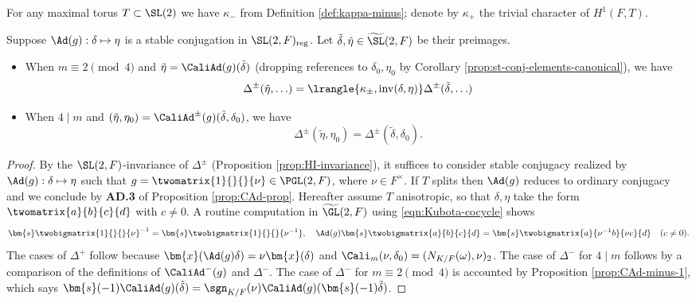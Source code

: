 \documentclass[a4paper,10pt]{article}
\begin{document}
For any maximal torus $T \subset \SL(2)$ we have $\kappa_-$ from Definition \ref{def:kappa-minus}; denote by $\kappa_+$ the trivial character of $H^1(F,T)$.
\begin{theorem}\label{prop:HI-cocycle}
	Suppose $\Ad(g): \delta \mapsto \eta$ is a stable conjugation in $\SL(2,F)_{\mathrm{reg}}$. Let $\tilde{\delta}, \tilde{\eta} \in \widetilde{\SL}(2,F)$ be their preimages.
	\begin{itemize}
		\item When $m \equiv 2 \pmod 4$ and $\tilde{\eta} = \CaliAd(g)(\tilde{\delta})$ (dropping references to $\delta_0, \eta_0$ by Corollary \ref{prop:st-conj-elements-canonical}), we have
			\begin{equation*}
				\Delta^\pm(\tilde{\eta}, \ldots) = \lrangle{\kappa_\pm, \mathrm{inv}(\delta, \eta)} \Delta^\pm(\tilde{\delta}, \ldots)
			\end{equation*}
		\item When $4 \mid m$ and $(\tilde{\eta}, \eta_0) = \CaliAd^\pm(g)(\tilde{\delta}, \delta_0)$, we have
			\begin{equation*}
				\Delta^\pm(\tilde{\eta}, \eta_0) = \Delta^\pm(\tilde{\delta}, \delta_0).
			\end{equation*}
	\end{itemize}
\end{theorem}
\begin{proof}
	By the $\SL(2,F)$-invariance of $\Delta^\pm$ (Proposition \ref{prop:HI-invariance}), it suffices to consider stable conjugacy realized by $\Ad(g): \delta \mapsto \eta$ such that $g = \twomatrix{1}{}{}{\nu} \in \PGL(2,F)$, where $\nu \in F^\times$. If $T$ splits then $\Ad(g)$ reduces to ordinary conjugacy and we conclude by \textbf{AD.3} of Proposition \ref{prop:CAd-prop}. Hereafter assume $T$ anisotropic, so that $\delta, \eta$ take the form $\twomatrix{a}{b}{c}{d}$ with $c \neq 0$. A routine computation in $\widetilde{\GL}(2,F)$ using \eqref{eqn:Kubota-cocycle} shows
	\[ \bm{s}\twobigmatrix{1}{}{}{\nu}^{-1} = \bm{s}\twobigmatrix{1}{}{}{\nu^{-1}}, \quad \Ad(g) \bm{s}\twobigmatrix{a}{b}{c}{d} = \bm{s}\twobigmatrix{a}{\nu^{-1}b}{\nu c}{d} \quad (c \neq 0). \]
	The cases of $\Delta^+$ follow because $\bm{x}(\Ad(g)\delta) = \nu\bm{x}(\delta)$ and $\Cali_m(\nu, \delta_0) = (N_{K/F}(\omega), \nu)_2$. The case of $\Delta^-$ for $4 \mid m$ follows by a comparison of the definitions of $\CaliAd^-(g)$ and $\Delta^-$. The case of $\Delta^-$ for $m \equiv 2 \pmod 4$ is accounted by Proposition \ref{prop:CAd-minus-1}, which says $\bm{s}(-1)\CaliAd(g)(\tilde{\delta}) = \sgn_{K/F}(\nu) \CaliAd(g)(\bm{s}(-1)\tilde{\delta})$.
\end{proof}
\end{document}
